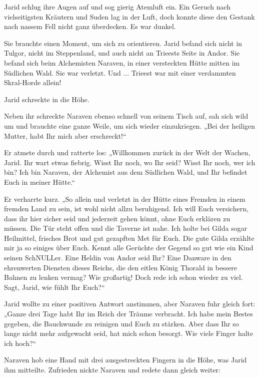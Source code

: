 
Jarid schlug ihre Augen auf und sog gierig Atemluft ein. Ein Geruch nach vielseitigsten Kräutern und Suden lag in der Luft, doch konnte diese den Gestank nach nassem Fell nicht ganz überdecken. Es war dunkel.

Sie brauchte einen Moment, um sich zu orientieren. Jarid befand sich nicht in Tulgor, nicht im Steppenland, und auch nicht an Trieests Seite in Andor. Sie befand sich beim Alchemisten Naraven, in einer versteckten Hütte mitten im Südlichen Wald. Sie war verletzt. Und ... Trieest war mit einer verdammten Skral-Horde allein!

Jarid schreckte in die Höhe.

Neben ihr schreckte Naraven ebenso schnell von seinem Tisch auf, sah sich wild um und brauchte eine ganze Weile, um sich wieder einzukriegen. „Bei der heiligen Mutter, habt Ihr mich aber erschreckt!“

Er atmete durch und ratterte los: „Willkommen zurück in der Welt der Wachen, Jarid. Ihr wart etwas fiebrig. Wisst Ihr noch, wo Ihr seid? Wisst Ihr noch, wer ich bin? Ich bin Naraven, der Alchemist aus dem Südlichen Wald, und Ihr befindet Euch in meiner Hütte.“

Er verharrte kurz. „So allein und verletzt in der Hütte eines Fremden in einem fremden Land zu sein, ist wohl nicht allzu beruhigend. Ich will Euch versichern, dass ihr hier sicher seid und jederzeit gehen könnt, ohne Euch erklären zu müssen. Die Tür steht offen und die Taverne ist nahe. Ich holte bei Gilda sogar Heilmittel, frisches Brot und gut gezapften Met für Euch. Die gute Gilda erzählte mir ja so einiges über Euch. Kennt alle Gerüchte der Gegend so gut wie ein Kind seinen SchNULLer. Eine Heldin von Andor seid Ihr? Eine Danware in den ehrenwerten Diensten dieses Reichs, die den eitlen König Thorald in bessere Bahnen zu lenken vermag? Wie großartig! Doch rede ich schon wieder zu viel. Sagt, Jarid, wie fühlt Ihr Euch?“

Jarid wollte zu einer positiven Antwort anstimmen, aber Naraven fuhr gleich fort: „Ganze drei Tage habt Ihr im Reich der Träume verbracht. Ich habe mein Bestes gegeben, die Bauchwunde zu reinigen und Euch zu stärken. Aber dass Ihr so lange nicht mehr aufgewacht seid, hat mich schon besorgt. Wie viele Finger halte ich hoch?“

Naraven hob eine Hand mit drei ausgestreckten Fingern in die Höhe, was Jarid ihm mitteilte. Zufrieden nickte Naraven und redete dann gleich weiter:

